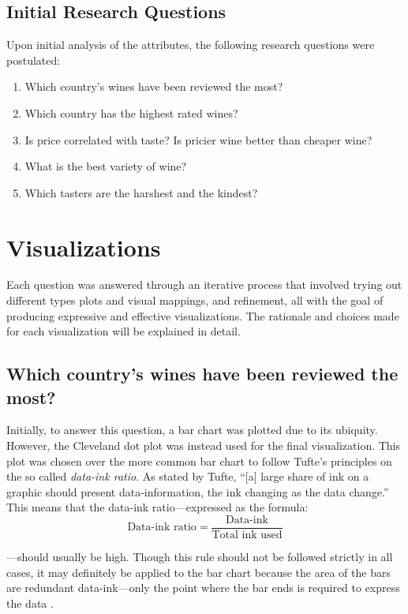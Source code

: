 \documentclass[11pt, twocolumn]{article}
\begin{document}
\subsection{Initial Research Questions}
Upon initial analysis of the attributes, the following research questions were postulated:
\begin{enumerate}
    \setlength\itemsep{0.1em}
    \item Which country's wines have been reviewed the most?
    \item Which country has the highest rated wines?
    \item Is price correlated with taste? Is pricier wine better than cheaper wine?
    \item What is the best variety of wine?
    \item Which tasters are the harshest and the kindest?
\end{enumerate}


\section{Visualizations}
Each question was answered through an iterative process that involved trying out different types plots and visual mappings, and refinement, all with the goal of producing expressive and effective visualizations. The rationale and choices made for each visualization will be explained in detail.

\subsection{Which country's wines have been reviewed the most?}
Initially, to answer this question, a bar chart was plotted due to its ubiquity. However, the Cleveland dot plot was instead used for the final visualization. This plot was chosen over the more common bar chart to follow Tufte's principles on the so called \emph{data-ink ratio}. As stated by Tufte, ``[a] large share of ink on a graphic should present data-information, the ink changing as the data change.'' This means that the data-ink ratio---expressed as the formula: 
$$
\textrm{Data-ink ratio} = \frac{\textrm{Data-ink}}{\textrm{Total ink used}}
$$



\noindent ---should usually be high. Though this rule should not be followed strictly in all cases, it may definitely be applied to the bar chart because the area of the bars are redundant data-ink---only the point where the bar ends is required to express the data \cite{Tufte}.  
\end{document}
